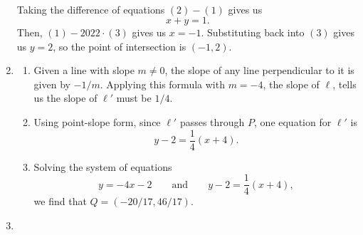 \begin{enumerate}
\begin{align*}
\end{align*}
Taking the difference of equations $(2) - (1)$ gives us 
\begin{equation*}
x + y = 1 \tag{3}.
\end{equation*}
Then, $(1) - 2022\cdot (3)$ gives us $x = -1$. Substituting back into $(3)$ gives us $y = 2$, so the point of intersection is $\boxed{(-1,2)}$.
\item \begin{enumerate}
\item Given a line with slope $m\neq 0$, the slope of any line perpendicular to it is given by $-1/m$. Applying this formula with $m = -4$, the slope of $\ell$, tells us the slope of $\ell'$ must be $\boxed{1/4}$.
\item Using point-slope form, since $\ell'$ passes through $P$, one equation for $\ell'$ is 
\begin{equation*}
\boxed{y - 2 = \frac{1}{4}(x + 4)}.
\end{equation*}
\item Solving the system of equations
\begin{equation*}
y = -4x - 2\qquad\text{and}\qquad y - 2 = \frac{1}{4}(x + 4),
\end{equation*}
we find that $Q = \boxed{(-20/17, 46/17)}$.
\end{enumerate}
\item 
\end{enumerate}